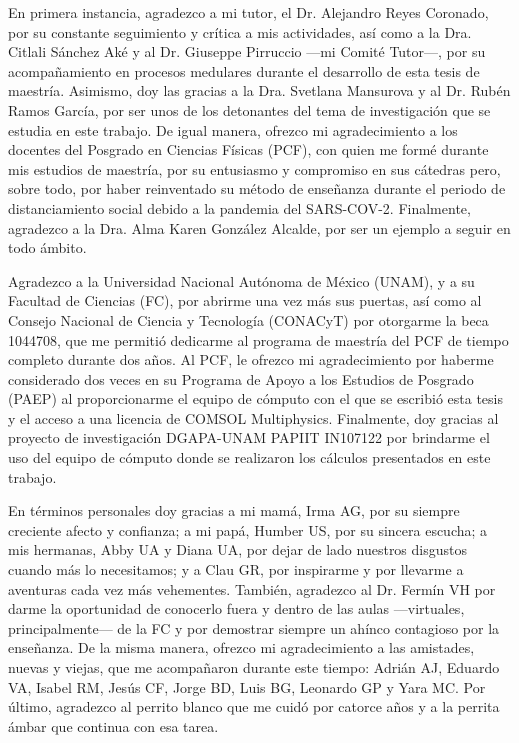 
\begin{acknowledgements}
\vfill
En primera instancia, agradezco a mi tutor, el Dr. Alejandro Reyes Coronado, por su constante seguimiento y crítica a mis actividades, así como a la Dra. Citlali Sánchez Aké y al Dr. Giuseppe Pirruccio ---mi Comité Tutor---,  por su acompañamiento en procesos medulares durante el desarrollo de esta tesis de maestría. Asimismo, doy las gracias a la Dra. Svetlana Mansurova y al Dr. Rubén Ramos García, por ser unos de los detonantes del tema de investigación que se estudia en este trabajo. De igual manera, ofrezco mi agradecimiento a los docentes del Posgrado en Ciencias Físicas (PCF), con quien me formé durante mis estudios de maestría, por su entusiasmo y compromiso en sus cátedras pero, sobre todo, por haber reinventado su método de enseñanza durante el periodo de  distanciamiento social debido a la pandemia del SARS-COV-2. Finalmente, agradezco a la Dra. Alma Karen González Alcalde, por ser un ejemplo a seguir en todo ámbito.

Agradezco a la Universidad Nacional Autónoma de México (UNAM), y a su Facultad de Ciencias (FC), por abrirme una vez más sus puertas, así como al Consejo Nacional de Ciencia y Tecnología (CONACyT)  por otorgarme la beca 1044708, que me permitió dedicarme al programa de maestría del PCF de tiempo completo durante dos años. Al PCF, le ofrezco mi agradecimiento por haberme considerado dos veces en su Programa de Apoyo a los Estudios de Posgrado (PAEP) al proporcionarme el equipo de cómputo con el que se escribió esta tesis y el acceso a una licencia de COMSOL Multiphysics\texttrademark{}. Finalmente, doy gracias  al proyecto de investigación DGAPA-UNAM PAPIIT IN107122 por brindarme el uso del equipo de cómputo donde se realizaron los cálculos presentados en este trabajo.

En términos personales doy gracias a mi mamá, Irma AG, por su siempre creciente afecto y confianza; a mi papá, Humber US, por su sincera escucha; a mis hermanas, Abby UA y Diana UA, por dejar de lado nuestros disgustos cuando más lo necesitamos; y a Clau GR, por inspirarme y por llevarme a aventuras cada vez más vehementes. También, agradezco al Dr. Fermín VH por darme la oportunidad de conocerlo fuera y dentro de las aulas ---virtuales, principalmente--- de la FC y por demostrar siempre un ahínco contagioso por la enseñanza. De la misma manera, ofrezco mi agradecimiento a las amistades, nuevas y viejas, que me acompañaron durante este tiempo: Adrián AJ, Eduardo VA, Isabel RM, Jesús CF, Jorge BD, Luis BG,  Leonardo GP y Yara MC. Por último, agradezco al perrito blanco que me cuidó por catorce años y a la perrita ámbar que continua con esa tarea.

\end{acknowledgements}
